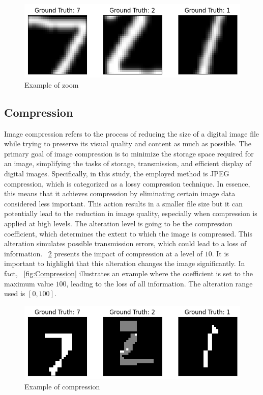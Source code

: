 \begin{figure}[h]
	\centering
	\includegraphics[width=0.6\linewidth]{ImageFiles/Alterations/Zoom}
	\caption{Example of zoom}
	\label{fig:Zoom}
\end{figure}

\subsection{Compression}

Image compression refers to the process of reducing the size of a digital image file while trying to preserve its visual quality and content as much as possible. The primary goal of image compression is to minimize the storage space required for an image, simplifying the tasks of storage, transmission, and efficient display of digital images. Specifically, in this study, the employed method is JPEG compression, which is categorized as a lossy compression technique. In essence, this means that it achieves compression by eliminating certain image data considered less important. This action results in a smaller file size but it can potentially lead to the reduction in image quality, especially when compression is applied at high levels. The alteration level is going to be the compression coefficient, which determines the extent to which the image is compressed. This alteration simulates possible transmission errors, which could lead to a loss of information. 
\Fig~\ref{fig:Compression_partial} presents the impact of compression at a level of $10$. It is important to highlight that this alteration changes the image significantly. In fact, \Fig~\ref{fig:Compression} illustrates an example where the coefficient is set to the maximum value $100$, leading to the loss of all information. The alteration range used is $[0,100]$.

\begin{figure}[h]
	\centering
	\includegraphics[width=0.6\linewidth]{ImageFiles/Alterations/Compression_partial}
	\caption{Example of compression}
	\label{fig:Compression_partial}
\end{figure}

